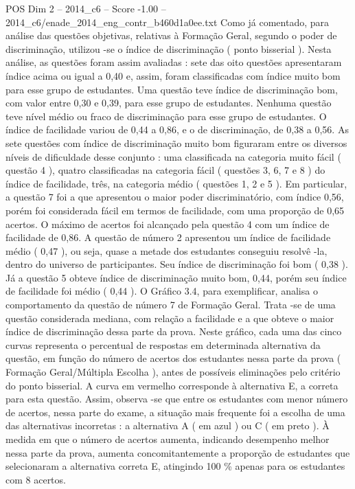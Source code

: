 \begin{textsample}{POS Dim 2 – 2014\_c6 – Score -1.00 – 2014\_c6/enade\_2014\_eng\_contr\_b460d1a0ee.txt}
Como já comentado, para análise das questões objetivas, relativas à Formação Geral, segundo o poder de discriminação, utilizou -se o índice de discriminação ( ponto bisserial ).
Nesta análise, as questões foram assim avaliadas : sete das oito questões apresentaram índice acima ou igual a 0,40 e, assim, foram classificadas com índice muito bom para esse grupo de estudantes.
Uma questão teve índice de discriminação bom, com valor entre 0,30 e 0,39, para esse grupo de estudantes.
Nenhuma questão teve nível médio ou fraco de discriminação para esse grupo de estudantes.
O índice de facilidade variou de 0,44 a 0,86, e o de discriminação, de 0,38 a 0,56.
As sete questões com índice de discriminação muito bom figuraram entre os diversos níveis de dificuldade desse conjunto : uma classificada na categoria muito fácil ( questão 4 ), quatro classificadas na categoria fácil ( questões 3, 6, 7 e 8 ) do índice de facilidade, três, na categoria médio ( questões 1, 2 e 5 ).
Em particular, a questão 7 foi a que apresentou o maior poder discriminatório, com índice 0,56, porém foi considerada fácil em termos de facilidade, com uma proporção de 0,65 acertos.
O máximo de acertos foi alcançado pela questão 4 com um índice de facilidade de 0,86.
A questão de número 2 apresentou um índice de facilidade médio ( 0,47 ), ou seja, quase a metade dos estudantes conseguiu resolvê -la, dentro do universo de participantes.
Seu índice de discriminação foi bom ( 0,38 ).
Já a questão 5 obteve índice de discriminação muito bom, 0,44, porém seu índice de facilidade foi médio ( 0,44 ).
O Gráfico 3.4, para exemplificar, analisa o comportamento da questão de número 7 de Formação Geral.
Trata -se de uma questão considerada mediana, com relação a facilidade e a que obteve o maior índice de discriminação dessa parte da prova.
Neste gráfico, cada uma das cinco curvas representa o percentual de respostas em determinada alternativa da questão, em função do número de acertos dos estudantes nessa parte da prova ( Formação Geral/Múltipla Escolha ), antes de possíveis eliminações pelo critério do ponto bisserial.
A curva em vermelho corresponde à alternativa E, a correta para esta questão.
Assim, observa -se que entre os estudantes com menor número de acertos, nessa parte do exame, a situação mais frequente foi a escolha de uma das alternativas incorretas : a alternativa A ( em azul ) ou C ( em preto ).
À medida em que o número de acertos aumenta, indicando desempenho melhor nessa parte da prova, aumenta concomitantemente a proporção de estudantes que selecionaram a alternativa correta E, atingindo 100 \% apenas para os estudantes com 8 acertos.

\end{textsample}
